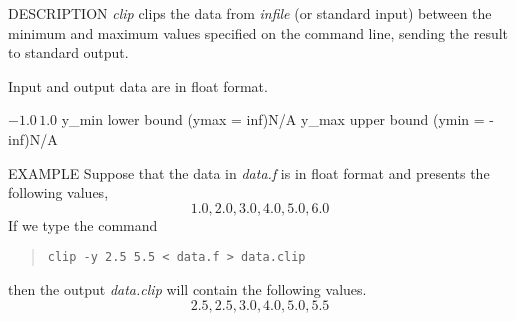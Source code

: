 \begin{synopsis}
\item[clip] [ --y $y_{min} \; y_{max}$ ] [ --ymin $y_{min}$ ] [ --ymax $y_{max}$ ] [ {\em infile} ]
\end{synopsis}

\begin{qsection}{DESCRIPTION}
{\em clip} clips the data from {\em infile} (or standard input) 
between the minimum and maximum values specified on the command line, 
sending the result to standard output.

Input and output data are in float format.
\end{qsection}

\begin{options}
		{$-1.0 \, 1.0$}
	 {y_{min}} {lower bound (ymax = inf)}{N/A}
	 {y_{max}} {upper bound (ymin = -inf)}{N/A}
\end{options}

\begin{qsection}{EXAMPLE}
Suppose that the data in {\em data.f} is in float format
and presents the following values,
\begin{displaymath}
 1.0, 2.0, 3.0, 4.0, 5.0, 6.0
\end{displaymath}
If we type the command
\begin{quote}
 \verb!clip -y 2.5 5.5 < data.f > data.clip!
\end{quote}
then the output {\em data.clip} will contain the following values.
\begin{displaymath}
 2.5, 2.5, 3.0, 4.0, 5.0, 5.5
\end{displaymath}
\end{qsection}
